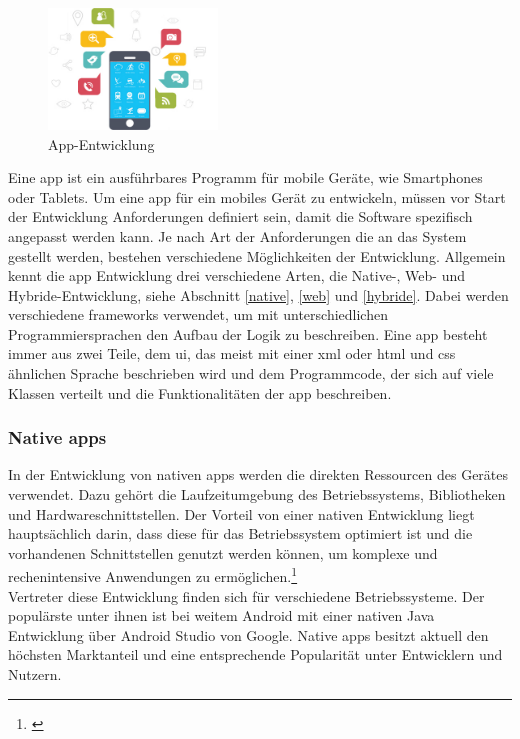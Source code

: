 \begin{figure}
	\begin{center}
		\includegraphics[width=0.4\textwidth]{images/technische_grundlagen/App-Development.jpg}
	\end{center}
	\caption{App-Entwicklung \cite{Nethority.Web&App}}	
	\label{fig:appentwicklung}
\end{figure}

Eine \gls{app} ist ein ausführbares Programm für mobile Geräte, wie Smartphones oder Tablets. Um eine \gls{app} für ein mobiles Gerät zu entwickeln, müssen vor Start der Entwicklung Anforderungen definiert sein, damit die Software spezifisch angepasst werden kann. Je nach Art der Anforderungen die an das System gestellt werden, bestehen verschiedene Möglichkeiten der Entwicklung. Allgemein kennt die \gls{app} Entwicklung drei verschiedene Arten, die Native-, Web- und Hybride-Entwicklung, siehe Abschnitt \eqref{native}, \eqref{web} und \eqref{hybride}. Dabei werden verschiedene \glspl{framework} verwendet, um mit unterschiedlichen Programmiersprachen den Aufbau der Logik zu beschreiben. Eine \gls{app} besteht immer aus zwei Teile, dem \gls{ui}, das meist mit einer \gls{xml} oder \gls{html} und \gls{css} ähnlichen Sprache beschrieben wird und dem Programmcode, der sich auf viele Klassen verteilt und die Funktionalitäten der \gls{app} beschreiben.

\subsubsection{Native \glspl{app}}\label{native}

In der Entwicklung von nativen \glspl{app} werden die direkten Ressourcen des Gerätes verwendet. Dazu gehört die Laufzeitumgebung des Betriebssystems, Bibliotheken und Hardwareschnittstellen. Der Vorteil von einer nativen Entwicklung liegt hauptsächlich darin, dass diese für das Betriebssystem optimiert ist und die vorhandenen Schnittstellen genutzt werden können, um komplexe und rechenintensive Anwendungen zu ermöglichen.\footnote{\citep[vgl.][Unterschiede und Vergleich native Apps vs. Web Apps]{DanielWurstl.Unterschiedeund}\label{note36}}\\
Vertreter diese Entwicklung finden sich für verschiedene Betriebssysteme. Der populärste unter ihnen ist bei weitem Android mit einer nativen Java Entwicklung über Android Studio von Google. Native \glspl{app} besitzt aktuell den höchsten Marktanteil und eine entsprechende Popularität unter Entwicklern und Nutzern.

